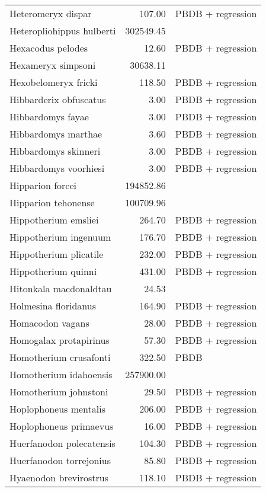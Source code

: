 \begin{table}[ht]
\begin{tabular}{lrl}
  Heteromeryx dispar & 107.00 & PBDB + regression \\ 
  Heteropliohippus hulberti & 302549.45 & \cite{Tomiya2013} \\ 
  Hexacodus pelodes & 12.60 & PBDB + regression \\ 
  Hexameryx simpsoni & 30638.11 & \cite{Tomiya2013} \\ 
  Hexobelomeryx fricki & 118.50 & PBDB + regression \\ 
  Hibbarderix obfuscatus & 3.00 & PBDB + regression \\ 
  Hibbardomys fayae & 3.00 & PBDB + regression \\ 
  Hibbardomys marthae & 3.60 & PBDB + regression \\ 
  Hibbardomys skinneri & 3.00 & PBDB + regression \\ 
  Hibbardomys voorhiesi & 3.00 & PBDB + regression \\ 
  Hipparion forcei & 194852.86 & \cite{Tomiya2013} \\ 
  Hipparion tehonense & 100709.96 & \cite{Tomiya2013} \\ 
  Hippotherium emsliei & 264.70 & PBDB + regression \\ 
  Hippotherium ingenuum & 176.70 & PBDB + regression \\ 
  Hippotherium plicatile & 232.00 & PBDB + regression \\ 
  Hippotherium quinni & 431.00 & PBDB + regression \\ 
  Hitonkala macdonaldtau & 24.53 & \cite{Tomiya2013} \\ 
  Holmesina floridanus & 164.90 & PBDB + regression \\ 
  Homacodon vagans & 28.00 & PBDB + regression \\ 
  Homogalax protapirinus & 57.30 & PBDB + regression \\ 
  Homotherium crusafonti & 322.50 & PBDB \\ 
  Homotherium idahoensis & 257900.00 & \cite{McKenna2011} \\ 
  Homotherium johnstoni & 29.50 & PBDB + regression \\ 
  Hoplophoneus mentalis & 206.00 & PBDB + regression \\ 
  Hoplophoneus primaevus & 16.00 & PBDB + regression \\ 
  Huerfanodon polecatensis & 104.30 & PBDB + regression \\ 
  Huerfanodon torrejonius & 85.80 & PBDB + regression \\ 
  Hyaenodon brevirostrus & 118.10 & PBDB + regression \\ 

\end{tabular}
\end{table}
